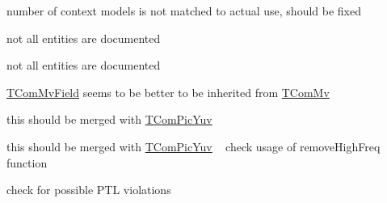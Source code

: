 
\begin{DoxyRefList}
\item[\label{todo__todo000001}%
\Hypertarget{todo__todo000001}%
File \hyperlink{_context_tables_8h}{Context\+Tables.h} ]number of context models is not matched to actual use, should be fixed  
\item[\label{todo__todo000002}%
\Hypertarget{todo__todo000002}%
File \hyperlink{_t_com_data_c_u_8cpp}{T\+Com\+Data\+CU.cpp} ]not all entities are documented  
\item[\label{todo__todo000003}%
\Hypertarget{todo__todo000003}%
File \hyperlink{_t_com_data_c_u_8h}{T\+Com\+Data\+CU.h} ]not all entities are documented  
\item[\label{todo__todo000004}%
\Hypertarget{todo__todo000004}%
File \hyperlink{_t_com_motion_info_8h}{T\+Com\+Motion\+Info.h} ]\hyperlink{class_t_com_mv_field}{T\+Com\+Mv\+Field} seems to be better to be inherited from \hyperlink{class_t_com_mv}{T\+Com\+Mv}  
\item[\label{todo__todo000005}%
\Hypertarget{todo__todo000005}%
File \hyperlink{_t_com_yuv_8cpp}{T\+Com\+Yuv.cpp} ]this should be merged with \hyperlink{class_t_com_pic_yuv}{T\+Com\+Pic\+Yuv}  
\item[\label{todo__todo000006}%
\Hypertarget{todo__todo000006}%
File \hyperlink{_t_com_yuv_8h}{T\+Com\+Yuv.h} ]this should be merged with \hyperlink{class_t_com_pic_yuv}{T\+Com\+Pic\+Yuv} ~\newline
 check usage of remove\+High\+Freq function  
\item[\label{todo__todo000007}%
\Hypertarget{todo__todo000007}%
Member \hyperlink{class_t_enc_top_a86ea6d845658a966b318b15366d189a0}{T\+Enc\+Top\+:\+:x\+Init\+Hrd\+Parameters} ()]check for possible P\+TL violations 
\end{DoxyRefList}